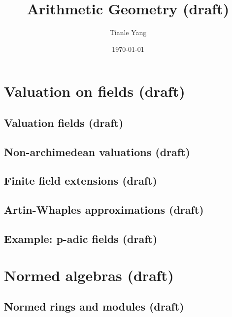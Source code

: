\documentclass[sectionlevel=book]{noteformyself}
\title{Arithmetic Geometry (draft)}
\author{Tianle Yang}
\date{\today}
\begin{document}
    \maketitle

    \frontmatter

    \tableofcontents %

    \mainmatter

    \chapter{Valuation on fields (draft)}
        \section{Valuation fields (draft)}
        
        \section{Non-archimedean valuations (draft)}
        
        \section{Finite field extensions (draft)}
        
        \section{Artin-Whaples approximations (draft)}
        
        \section{Example: p-adic fields (draft)}
        

    \chapter{Normed algebras (draft)}
        \section{Normed rings and modules (draft)}
        
\end{document}
